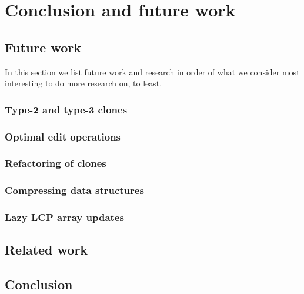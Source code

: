 \chapter{Conclusion and future work}

\section{Future work}

In this section we list future work and research in order of what we consider
most interesting to do more research on, to least.

\subsection*{Type-2 and type-3 clones}

\subsection*{Optimal edit operations}

\subsection*{Refactoring of clones}

\subsection*{Compressing data structures}

\subsection*{Lazy LCP array updates}

\section{Related work}


\section{Conclusion}
